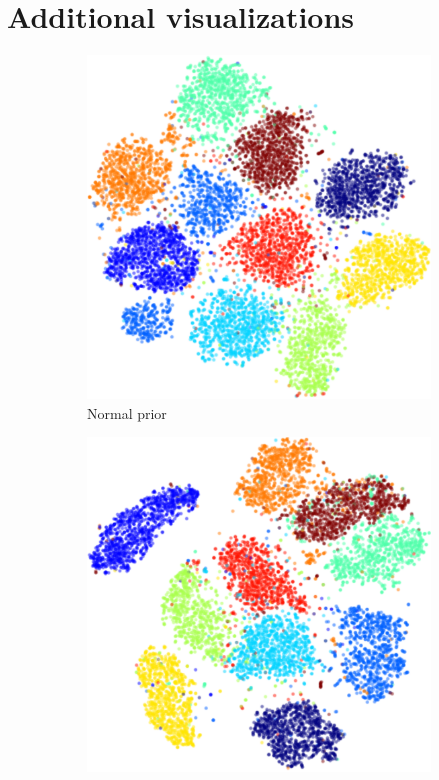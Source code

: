 \section{Additional visualizations}

\begin{figure}[h]
\begin{subfigure}[t]{0.3\textwidth}
    \centering
    \includegraphics[width=\textwidth]{img/loracs/mnist/tsne/mnist2-tsne-normal.png}
    \caption{Normal prior}
\end{subfigure}
\begin{subfigure}[t]{0.3\textwidth}
    \centering
    \includegraphics[width=\textwidth]{img/loracs/mnist/tsne/mnist2-tsne-noprior.png}

\end{subfigure}
\end{figure}
